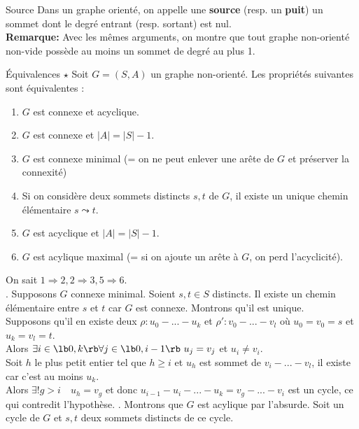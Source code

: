 \documentclass[french, 11pt]{article}
\begin{document}
\vspace*{-0.7cm}

\begin{defi}{Source}{}
    Dans un graphe orienté, on appelle une \textbf{source} (resp. un \textbf{puit}) un sommet dont le degré entrant (resp. sortant) est nul.\\
    \textbf{Remarque:} Avec les mêmes arguments, on montre que tout graphe non-orienté non-vide possède au moins un sommet de degré au plus 1.
\end{defi}

\vspace*{-0.7cm}

\begin{prop}{Équivalences $\star$}{}
    Soit $G=(S,A)$ un graphe non-orienté. Les propriétés suivantes sont équivalentes :
    \begin{enumerate}
        \item $G$ est connexe et acyclique.
        \item $G$ est connexe et $|A|=|S|-1$.
        \item $G$ est connexe minimal (= on ne peut enlever une arête de $G$ et préserver la connexité)
        \item Si on considère deux sommets distincts $s,t$ de $G$, il existe un unique chemin élémentaire $s\leadsto t$.
        \item $G$ est acyclique et $|A|=|S|-1$.
        \item $G$ est acylique maximal (= si on ajoute un arête à $G$, on perd l'acyclicité).
    \end{enumerate}
    \tcblower
    On sait $1\Rightarrow2,2\Rightarrow3,5\Rightarrow6$.\\
    . Supposons $G$ connexe minimal. Soient $s,t\in S$ distincts. Il existe un chemin élémentaire entre $s$ et $t$ car $G$ est connexe. Montrons qu'il est unique.\\
    Supposons qu'il en existe deux $\rho:u_0-...-u_k$ et $\rho':v_0-...-v_l$ où $u_0=v_0=s$ et $u_k=v_l=t$.\\
    Alors $\exists i \in \lb0,k\rb \forall j \in \lb 0, i-1 \rb ~ u_j = v_j$ et $u_i\neq v_i$.\\
    Soit $h$ le plus petit entier tel que $h\geq i$ et $u_h$ est sommet de $v_i-...-v_l$, il existe car c'est au moins $u_k$.\\
    Alors $\exists!g>i \quad u_h=v_g$  et donc $u_{i-1}-u_i-...-u_k=v_g-...-v_i$ est un cycle, ce qui contredit l'hypothèse.\n
    . Montrons que $G$ est acylique par l'absurde. Soit un cycle de $G$ et $s,t$ deux sommets distincts de ce cycle.

\end{prop}
\end{document}
